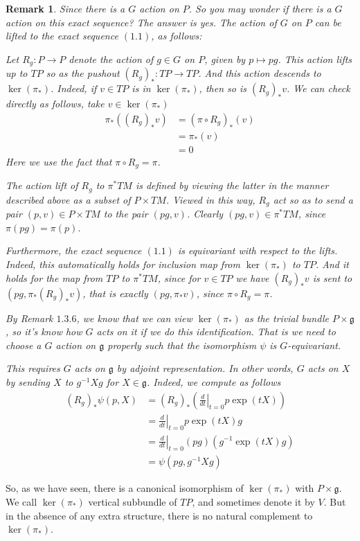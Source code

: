 \documentclass[11pt]{amsart}
\numberwithin{equation}{section}
\theoremstyle{plain}
\theoremstyle{plain}
\newtheorem{remksub}[thmsub]{Remark}
\numberwithin{equation}{section}
\begin{document}
\begin{remksub}\normalfont
Since there is a $G$ action on $P$. So you may wonder if there is a $G$ action on this exact sequence? The answer is yes. The action of $G$ on $P$ can be lifted to the exact sequence $(1.1)$, as follows: 

Let $R_g:P\to P$ denote the action of $g\in G$ on $P$, given by $p\mapsto pg$. This action lifts up to $TP$ so as the pushout $(R_g)_*:TP\to TP$. And this action descends to $\operatorname{ker}(\pi_*)$. Indeed, if $v\in TP$ is in $\operatorname{ker}(\pi_*)$, then so is $(R_g)_*v$. We can check directly as follows, take $v\in\operatorname{ker}(\pi_*)$
$$
\begin{aligned}
\pi_*((R_g)_*v)&=(\pi\circ R_g)_*(v)\\
&=\pi_*(v)\\
&=0
\end{aligned}
$$
Here we use the fact that $\pi\circ R_g=\pi$. 

The action lift of $R_g$ to $\pi^*TM$ is defined by viewing the latter in the manner described above as a subset of $P\times TM$. Viewed in this way, $R_g$ act so as to send a pair $(p,v)\in P\times TM$ to the pair $(pg,v)$. Clearly $(pg,v)\in\pi^*TM$, since $\pi(pg)=\pi(p)$.

Furthermore, the exact sequence $(1.1)$ is equivariant with respect to the lifts. Indeed, this automatically holds for inclusion map from $\operatorname{ker}(\pi_*)$ to $TP$. And it holds for the map from $TP$ to $\pi^*TM$, since for $v\in TP$ we have $(R_g)_*v$ is sent to $(pg,\pi_*(R_g)_*v)$, that is exactly $(pg,\pi_*v)$, since $\pi\circ R_g=\pi$.

By Remark $1.3.6$, we know that we can view $\operatorname{ker}(\pi_*)$ as the trivial bundle $P\times\mathfrak{g}$, so it's know how $G$ acts on it if we do this identification. That is we need to choose a $G$ action on $\mathfrak{g}$ properly such that the isomorphism $\psi$ is $G$-equivariant. 

This requires $G$ acts on $\mathfrak{g}$ by adjoint representation. In other words, $G$ acts on $X$ by sending $X$ to $g^{-1}Xg$ for $X\in\mathfrak{g}$.
Indeed, we compute as follows
$$
\begin{aligned}
(R_g)_*\psi(p,X) &=(R_g)_*\left(\left.\frac{d}{d t}\right|_{t=0} p\exp (t X)\right) \\
&=\left.\frac{d}{d t}\right|_{t=0} p\exp (t X) g \\
&=\left.\frac{d}{d t}\right|_{t=0}(pg)\left(g^{-1} \exp (t X) g\right) \\
&=\psi(pg,g^{-1}Xg)
\end{aligned}
$$
\end{remksub}
So, as we have seen, there is a canonical isomorphism of $\operatorname{ker}(\pi_*)$ with $P\times\mathfrak{g}$. We call $\operatorname{ker}(\pi_*)$ vertical subbundle of $TP$, and sometimes denote it by $V$. But in the absence of any extra structure, there is no natural complement to $\operatorname{ker}(\pi_*)$.
\end{document}
